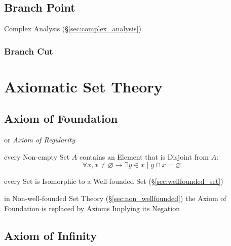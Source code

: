 \subsection{Branch Point}\label{sec:branch_point}

Complex Analysis (\S\ref{sec:complex_analysis})



\subsubsection{Branch Cut}\label{sec:branch_cut}



\section{Axiomatic Set Theory}\label{sec:axiomatic_set_theory}

\subsection{Axiom of Foundation}\label{sec:foundation_axiom}

or \emph{Axiom of Regularity}

every Non-empty Set $A$ contains an Element that is Disjoint from $A$:
\[
  \forall x, x \neq \varnothing \to \exists y \in x \mid y
  \cap x = \varnothing
\]

every Set is Isomorphic to a Well-founded Set
(\S\ref{sec:wellfounded_set})

in Non-well-founded Set Theory (\S\ref{sec:non_wellfounded}) the Axiom
of Foundation is replaced by Axioms Implying its Negation



\subsection{Axiom of Infinity}\label{sec:infinity_axiom}

